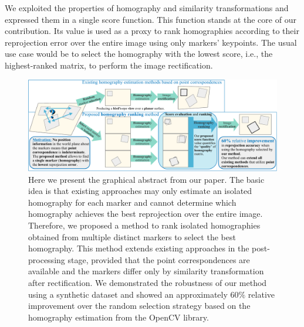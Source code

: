 We exploited the properties of homography and similarity transformations and expressed them in a single score function. This function stands at the core of our contribution. Its value is used as a proxy to rank homographies according to their reprojection error over the entire image using only markers' keypoints. The usual use case would be to select the homography with the lowest score, i.e., the highest-ranked matrix, to perform the image rectification.

\begin{figure}[t]
    \centerline{\includegraphics[width=\linewidth]{figures/homography/graphical_abstract.pdf}}
    \caption[Homography ranking graphical abstract]{Here we present the graphical abstract from our paper. The basic idea is that existing approaches may only estimate an isolated homography for each marker and cannot determine which homography achieves the best reprojection over the entire image. Therefore, we proposed a method to rank isolated homographies obtained from multiple distinct markers to select the best homography. This method extends existing approaches in the post-processing stage, provided that the point correspondences are available and the markers differ only by similarity transformation after rectification. We demonstrated the robustness of our method using a synthetic dataset and showed an approximately $60\%$ relative improvement over the random selection strategy based on the homography estimation from the OpenCV library.}
    \label{fig:GraphicalAbstract}
\end{figure}

